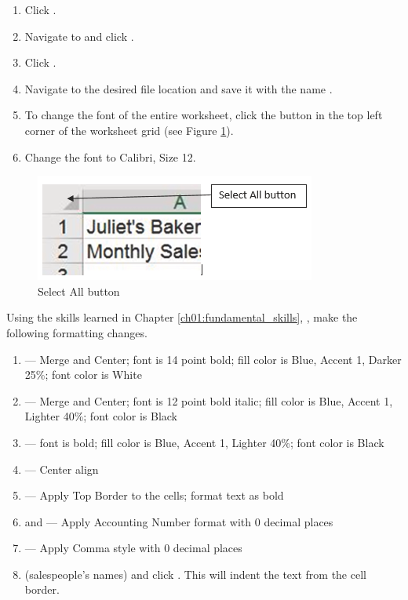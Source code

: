 \begin{enumerate}
	\item Click .
	\item Navigate to  and click .
	\item Click .
	\item Navigate to the desired file location and save it with the name .
	\item To change the font of the entire worksheet, click the  button in the top left corner of the worksheet grid (see Figure \ref{02:fig41}).
	\item Change the font to Calibri, Size 12.
\end{enumerate}

\begin{figure}[H]
	\centering
	\includegraphics[width=\maxwidth{.95\linewidth}]{gfx/ch02_fig41}
	\caption{Select All button}
	\label{02:fig41}
\end{figure}

Using the skills learned in Chapter \ref{ch01:fundamental_skills}, , make the following formatting changes.

\begin{enumerate}
	\item {} --- Merge and Center; font is 14 point bold; fill color is Blue, Accent 1, Darker 25\%; font color is White
	\item {} --- Merge and Center; font is 12 point bold italic; fill color is Blue, Accent 1, Lighter 40\%; font color is Black
	\item {} --- font is bold; fill color is Blue, Accent 1, Lighter 40\%; font color is Black
	\item {} --- Center align
	\item {} --- Apply Top Border to the cells; format text as bold
	\item {} and  --- Apply Accounting Number format with $ 0 $ decimal places
	\item {} --- Apply Comma style with $ 0 $ decimal places
	\item {} (salespeople's names) and click . This will indent the text from the cell border.
\end{enumerate}

